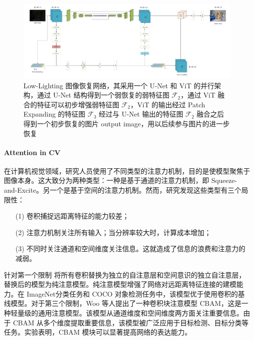 \documentclass[a4paper, 10pt]{article}
\begin{document}
		\begin{figure}[htbp]
			\centering 
			\includegraphics[width=\columnwidth]{picture/LLIE/First architecture}
			\caption{
				\label{fig: First Architecture} 
				Low-Lighting 图像恢复网络，其采用一个 U-Net 和 ViT 的并行架构，通过 U-Net 结构得到一个弱恢复的弱特征图 $\mathcal{F}_2$，通过 ViT 融合的特征可以初步增强弱特征图 $\mathcal{F}_2$，ViT 的输出经过 Patch Expanding 的特征图 $\mathcal{F}_3$ 经过与 U-Net 输出的特征图 $\mathcal{F}_2$ 融合之后得到一个初步恢复的图片 output image，用以后续参与图片的进一步恢复
			}
		\end{figure}
		
		\paragraph{Attention in CV}
		
		在计算机视觉领域，研究人员使用了不同类型的注意力机制，目的是使模型聚焦于图像本身。这大致分为两种类型：一种是基于通道的注意力机制，即 Squeeze-and-Excite。另一个是基于空间的注意力机制\cite{woo2018cbam}。然而，研究发现这些类型有三个局限性：
		
		\begin{itemize}
			\item[(1)] 
			卷积捕捉远距离特征的能力较差；
			
			\item[(2)]
			注意力机制关注所有输入；当分辨率较大时，计算成本增加；
			
			\item[(3)]
			不同时关注通道和空间维度关注信息。这就造成了信息的浪费和注意力的减弱。
		\end{itemize}	
		
		针对第一个限制 \cite{ramachandran2019stand} 将所有卷积替换为独立的自注意层和空间意识的独立自注意层，替换后的模型为纯注意模型。纯注意模型增强了网络对远距离特征连接的建模能力。在 ImageNet分类任务和 COCO 对象检测任务中，该模型优于使用卷积的基线模型。对于第三个限制，Woo 等人\cite{woo2018cbam}提出了一种卷积块注意模型 CBAM，这是一种轻量级的通用注意模型。该模型从通道维度和空间维度两方面关注重要信息。由于 CBAM 从多个维度提取重要信息，该模型被广泛应用于目标检测、目标分类等任务。实验表明，CBAM 模块可以显著提高网络的表达能力。
		
\end{document}

